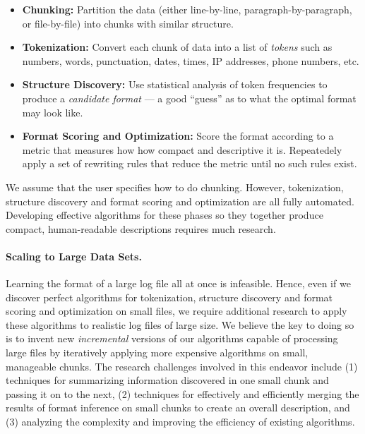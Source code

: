 \begin{itemize}
\item {\bf Chunking:}  Partition the data (either line-by-line,
  paragraph-by-paragraph, or file-by-file) into chunks with similar structure.
\item {\bf Tokenization:}  Convert each chunk of data into a list of 
{\em tokens} such as numbers, words, punctuation, dates, times, IP addresses, phone numbers, etc.
\item {\bf Structure Discovery:}  Use statistical analysis of token
  frequencies to produce a {\em candidate format} --- a good ``guess''
  as to what the optimal format may look like. 
\item {\bf Format Scoring and Optimization:}  Score the format
  according to a metric that measures how how compact and descriptive
  it is.  Repeatedely apply a set of rewriting rules that reduce the
  metric until no such rules exist.
\end{itemize}

We assume that the user specifies how to do chunking.  However,
tokenization, structure discovery and format scoring and optimization are all
fully automated.  Developing effective algorithms for these phases so they together 
produce compact, human-readable descriptions requires much research. 

\paragraph*{Scaling to Large Data Sets.}  Learning the format of a large
log file all at once is infeasible.  Hence, even if we discover perfect
algorithms for tokenization, structure discovery and format scoring and optimization
on small files, we require additional research to apply these algorithms
to realistic log files of large size.  We believe the key to doing so is to invent
new {\em incremental} versions of our algorithms capable of 
processing large files by iteratively applying more expensive
algorithms on small, manageable chunks.  The research challenges
involved in this endeavor include (1) techniques for summarizing
information discovered in one small chunk and passing it on to the
next, (2) techniques for effectively and
efficiently merging the results of format inference on small chunks
to create an overall description, and (3) analyzing the complexity and
improving the efficiency of existing algorithms.


